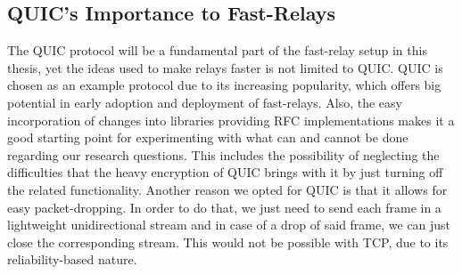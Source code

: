 \subsection{QUIC's Importance to Fast-Relays}
The QUIC protocol will be a fundamental part of the fast-relay setup in this thesis, yet the ideas used 
to make relays faster is not limited to QUIC\@.
QUIC is chosen as an example protocol due to its increasing popularity, which offers big potential 
in early adoption and deployment of fast-relays.
Also, the easy incorporation of changes into libraries providing RFC implementations makes it a good 
starting point for experimenting with what can and cannot be done regarding our research questions.
This includes the possibility of neglecting the difficulties that the heavy encryption of QUIC brings with 
it by just turning off the related functionality.
Another reason we opted for QUIC is that it allows for easy packet-dropping.
In order to do that, we just need to send each frame in a lightweight unidirectional stream and in 
case of a drop of said frame, we can just close the corresponding stream.
This would not be possible with TCP, due to its reliability-based nature.

